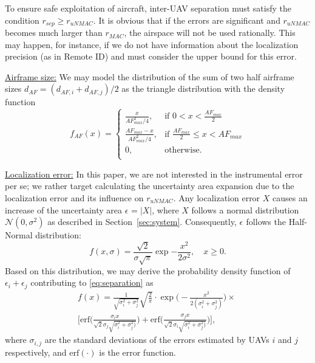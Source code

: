 \documentclass[10pt,conference]{IEEEtran}
\begin{document}
To ensure safe exploitation of aircraft, inter-UAV separation must satisfy the condition $r_{sep} \geq r_{uNMAC}$. It is obvious that if the errors are significant and $r_{uNMAC}$ becomes much larger than $r_{MAC}$, the airspace will not be used rationally. This may happen, for instance, if we do not have information about the localization precision (as in Remote ID) and must consider the upper bound for this error.  

\underline{Airframe size:}
We may model the distribution of the sum of two half airframe sizes $d_{AF}=(d_{AF,i}+d_{AF,j})/2$ as the triangle distribution with the density function
\begin{equation}\label{eq:AF}
  f_{AF}(x)=\begin{cases}
    \frac{x}{AF_{max}^2/4}, & \text{if $0<x<\frac{AF_{max}}{2}$}\\
    \frac{AF_{max}-x}{AF_{max}^2/4}, & \text{if $\frac{AF_{max}}{2}\leq x<AF_{max}$}\\
    0, & \text{otherwise}.\\
  \end{cases}
\end{equation}
 
\underline{Localization error:}
In this paper, we are not interested in the instrumental error per se; we rather target calculating the uncertainty area expansion due to the localization error and its influence on $r_{uNMAC}$. Any localization error $X$ causes an increase of the uncertainty area $\epsilon_{}=|X|$, where $X$ follows a normal distribution $\mathcal{N}(0,\sigma^2)$ as described in Section~\ref{sec:system}. Consequently, $\epsilon_{}$ follows the Half-Normal distribution:
\begin{equation}
    f(x,\sigma)=\frac{\sqrt{2}}{\sigma\sqrt{\pi}}\exp{-\frac{x^2}{2\sigma^2}},  \quad   x\geq0.
\end{equation}
Based on this distribution, we may derive the probability density function of $\epsilon_i+\epsilon_j$ contributing to \eqref{eq:separation} as
\begin{eqnarray}\label{eq:loc}
    f(x)=\frac{1}{\sqrt{\sigma^2_i+\sigma^2_j}} \sqrt{\frac{2}{\pi}} \cdot \exp{\Big(-\frac{x^2}{2(\sigma^2_i+\sigma^2_j)}}\Big) \times \nonumber\ \\
    \Bigg[ \mathrm{erf} \Bigg(\frac{\sigma_i x}{\sqrt{2}\sigma_j \sqrt{\sigma_i^2+\sigma^2_j)}}\Bigg)+
    \mathrm{erf} \Bigg(\frac{\sigma_j x}{\sqrt{2}\sigma_i \sqrt{\sigma_i^2+\sigma^2_j)}}\Bigg) \Bigg],
\end{eqnarray}
where $\sigma_{i,j}$ are the standard deviations of the errors estimated by UAVs $i$ and $j$ respectively, and $\mathrm{erf}(\cdot)$ is the error function.
\end{document}

